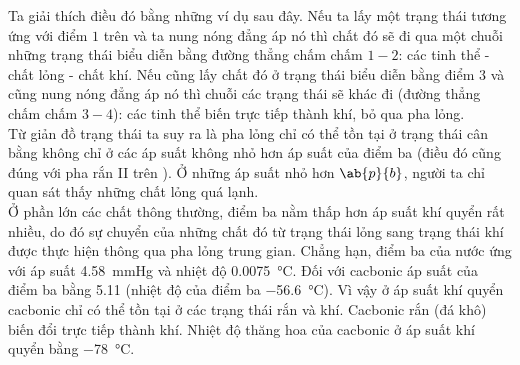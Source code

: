 Ta giải thích điều đó bằng những ví dụ sau đây. Nếu ta lấy một trạng thái tương ứng với điểm $1$ trên  và ta nung nóng đẳng áp nó thì chất đó sẽ đi qua một chuỗi những trạng thái biểu diễn bằng đường thẳng chấm chấm $1-2$: các tinh thể - chất lỏng - chất khí. Nếu cũng lấy chất đó ở trạng thái biểu diễn bằng điểm $3$ và cũng nung nóng đẳng áp nó thì chuỗi các trạng thái sẽ khác đi (đường thẳng chấm chấm $3-4$): các tinh thể biến trực tiếp thành khí, bỏ qua pha lỏng.\\

Từ giản đồ trạng thái ta suy ra là pha lỏng chỉ có thể tồn tại ở trạng thái cân bằng không chỉ ở các áp suất không nhỏ hơn áp suất của điểm ba (điều đó cũng đúng với pha rắn II trên ). Ở những áp suất nhỏ hơn $\ab{p}{b}$, người ta chỉ quan sát thấy những chất lỏng quá lạnh.\\

Ở phần lớn các chất thông thường, điểm ba nằm thấp hơn áp suất khí quyển rất nhiều, do đó sự chuyển của những chất đó từ trạng thái lỏng sang trạng thái khí được thực hiện thông qua pha lỏng trung gian. Chẳng hạn, điểm ba của nước ứng với áp suất \SI{4.58}{\mmHg} và nhiệt độ \SI{0.0075}{\degreeCelsius}. Đối với cacbonic áp suất của điểm ba bằng \SI{5.11}{\atm} (nhiệt độ của điểm ba \SI{-56.6}{\degreeCelsius}). Vì vậy ở áp suất khí quyển cacbonic chỉ có thể tồn tại ở các trạng thái rắn và khí. Cacbonic rắn (đá khô) biến đổi trực tiếp thành khí. Nhiệt độ thăng hoa của cacbonic ở áp suất khí quyển bằng \SI{-78}{\degreeCelsius}.\\

